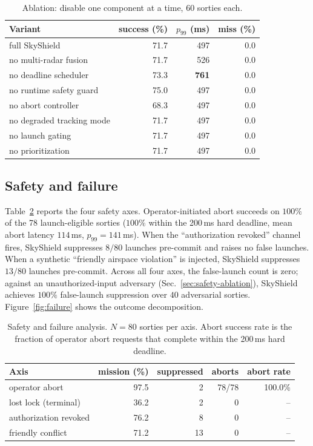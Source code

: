 \documentclass[conference]{IEEEtran}
\begin{document}
\begin{table}[t]
\centering
\caption{Ablation: disable one component at a time, 60 sorties each.}
\label{tab:ablation}
\small
\begin{tabular}{lrrr}
\toprule
Variant                                   & success (\%) & $p_{99}$ (ms) & miss (\%)\\
\midrule
full SkyShield                            & 71.7 & 497 & 0.0\\
no multi-radar fusion                     & 71.7 & 526 & 0.0\\
no deadline scheduler                     & 73.3 & \textbf{761} & 0.0\\
no runtime safety guard                   & 75.0 & 497 & 0.0\\
no abort controller                       & 68.3 & 497 & 0.0\\
no degraded tracking mode                 & 71.7 & 497 & 0.0\\
no launch gating                          & 71.7 & 497 & 0.0\\
no prioritization                         & 71.7 & 497 & 0.0\\
\bottomrule
\end{tabular}
\end{table}

\subsection{Safety and failure}
\label{sec:safety}
Table~\ref{tab:safety} reports the four safety axes.  Operator-initiated
abort succeeds on $100\%$ of the 78 launch-eligible sorties
($100\%$ within the 200\,ms hard deadline, mean abort latency
$114$\,ms, $p_{99}=141$\,ms).  When the ``authorization revoked''
channel fires, SkyShield suppresses $8/80$ launches pre-commit and raises
no false launches.  When a synthetic ``friendly airspace violation'' is
injected, SkyShield suppresses $13/80$ launches pre-commit.  Across all
four axes, the false-launch count is zero; against an unauthorized-input
adversary (Sec.~\ref{sec:safety-ablation}), SkyShield achieves
$100\%$ false-launch suppression over $40$ adversarial sorties.
Figure~\ref{fig:failure} shows the outcome decomposition.

\begin{table}[t]
\centering
\caption{Safety and failure analysis.  $N=80$ sorties per axis.  Abort
success rate is the fraction of operator abort requests that complete
within the 200\,ms hard deadline.}
\label{tab:safety}
\small
\begin{tabular}{lrrrr}
\toprule
Axis                     & mission (\%) & suppressed & aborts & abort rate\\
\midrule
operator abort           & 97.5 &  2 & 78/78 & 100.0\%\\
lost lock (terminal)     & 36.2 &  2 & 0     &    --\\
authorization revoked    & 76.2 &  8 & 0     &    --\\
friendly conflict        & 71.2 & 13 & 0     &    --\\
\bottomrule
\end{tabular}
\end{table}
\end{document}
